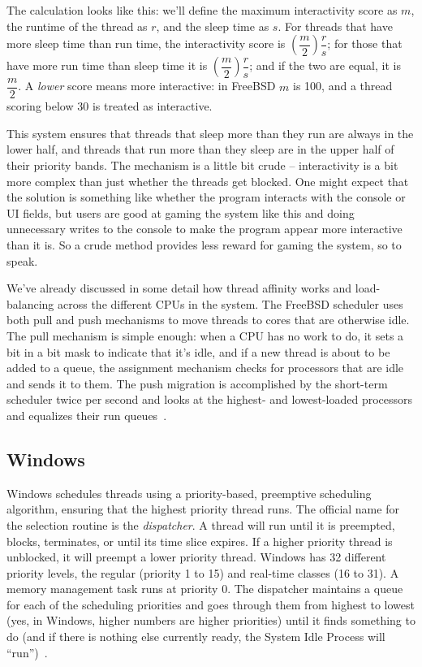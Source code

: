 The calculation looks like this: we'll define the maximum interactivity score as $m$, the runtime of the thread as $r$, and the sleep time as $s$. For threads that have more sleep time than run time, the interactivity score is $\left(\dfrac{m}{2}\right)\dfrac{r}{s}$; for those that have more run time than sleep time it is $\left(\dfrac{m}{2}\right)\dfrac{r}{s}$; and if the two are equal, it is $\dfrac{m}{2}$. A \textit{lower} score means more interactive: in FreeBSD $m$ is 100, and a thread scoring below 30 is treated as interactive.
  
This system ensures that threads that sleep more than they run are always in the lower half, and threads that run more than they sleep are in the upper half of their priority bands. The mechanism is a little bit crude -- interactivity is a bit more complex than just whether the threads get blocked. One might expect that the solution is something like whether the program interacts with the console or UI fields, but users are good at gaming the system like this and doing unnecessary writes to the console to make the program appear more interactive than it is. So a crude method provides less reward for gaming the system, so to speak.

We've already discussed in some detail how thread affinity works and load-balancing across the different CPUs in the system. The FreeBSD scheduler uses both pull and push mechanisms to move threads to cores that are otherwise idle. The pull mechanism is simple enough: when a CPU has no work to do, it sets a bit in a bit mask to indicate that it's idle, and if a new thread is about to be added to a queue, the assignment mechanism checks for processors that are idle and sends it to them. The push migration is accomplished by the short-term scheduler twice per second and looks at the highest- and lowest-loaded processors and equalizes their run queues~\cite{osi}. 

\subsection*{Windows}

Windows schedules threads using a priority-based, preemptive scheduling algorithm, ensuring that the highest priority thread runs. The official name for the selection routine is the \textit{dispatcher}. A thread will run until it is preempted, blocks, terminates, or until its time slice expires. If a higher priority thread is unblocked, it will preempt a lower priority thread. Windows has 32 different priority levels, the regular (priority 1 to 15) and real-time classes (16 to 31). A memory management task runs at priority 0. The dispatcher maintains a queue for each of the scheduling priorities and goes through them from highest to lowest (yes, in Windows, higher numbers are higher priorities) until it finds something to do (and if there is nothing else currently ready, the System Idle Process will ``run'')~\cite{osc}.


